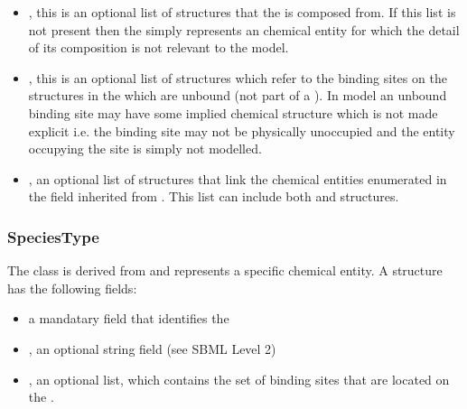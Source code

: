 \documentclass{cekarticle}
\begin{document}
\begin{itemize}

\item {}, this is an optional list of 
structures that the  is composed from.  If this list is not present
then the  simply represents an chemical entity for which the detail
of its composition is not relevant to the model.

\item {}, this is an optional list of  structures which
refer to the binding sites on the  structures in the 
which are unbound (not part of a ).  In model an unbound binding site may have
some implied chemical structure which is not made explicit i.e. the binding site may not be physically
unoccupied and the entity occupying the site is simply not modelled.

\item {}, an optional list of  structures that link the chemical entities 
enumerated in the  field inherited from .
This list can include both  and  structures.

\end{itemize}

\subsubsection{SpeciesType}

The class  is derived from  and represents a specific
chemical entity.  A  structure has the following fields:

\begin{itemize}

\item {} a mandatary  field that identifies the 

\item {}, an optional string field (see SBML Level 2)

\item {}, an optional  list, which contains the set of binding
sites that are located on the .

\end{itemize} 
\end{document}
